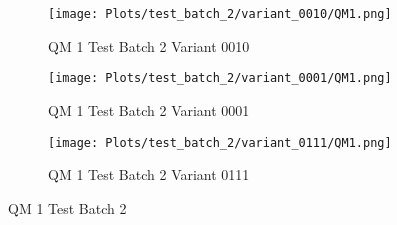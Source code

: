 \documentclass{DissertateFigs}
\begin{document}
\begin{figure}[t!]
\medskip

    \begin{subfigure}{0.47\textwidth}
    \texttt{[image: Plots/test\_batch\_2/variant\_0010/QM1.png]}
    \caption{QM 1 Test Batch 2 Variant 0010}
    \end{subfigure}
    \begin{subfigure}{0.47\textwidth}
    \texttt{[image: Plots/test\_batch\_2/variant\_0001/QM1.png]}
    \caption{QM 1 Test Batch 2 Variant 0001}
    \end{subfigure}

\medskip

    \begin{subfigure}{0.47\textwidth}
    \texttt{[image: Plots/test\_batch\_2/variant\_0111/QM1.png]}
    \caption{QM 1 Test Batch 2 Variant 0111}
    \end{subfigure}
\caption{QM 1 Test Batch 2}
    \end{figure}
\clearpage
\end{document}
